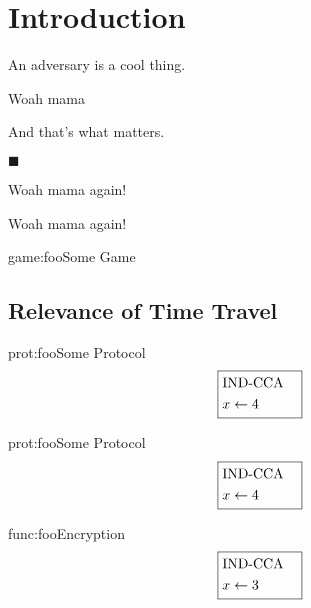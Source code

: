 \section{Introduction}

\cite{EPRINT:Meier22}

\begin{definition}[Adversaries]
An adversary is a cool thing.
\end{definition}

\begin{theorem}
    Woah mama

And that's what matters.

$\blacksquare$
\end{theorem}

\begin{lemma}
    Woah mama again!
\end{lemma}

\begin{corollary}
    Woah mama again!
\end{corollary}

\begin{game}{game:foo}{Some Game}
\end{game}

\subsection{Relevance of Time Travel}

\begin{protocol}{prot:foo}{Some Protocol}
$$
\boxed{
\begin{aligned}
&\text{IND-CCA}\cr
&x \gets 4\cr
\end{aligned}
}
$$
\end{protocol}

\begin{protocol}{prot:foo}{Some Protocol}
$$
\boxed{
\begin{aligned}
&\text{IND-CCA}\cr
&x \gets 4\cr
\end{aligned}
}
$$
\end{protocol}

\begin{functionality}{func:foo}{Encryption}
$$
\boxed{
\begin{aligned}
&\text{IND-CCA}\cr
&x \gets 3\cr
\end{aligned}
}
$$
\end{functionality}

